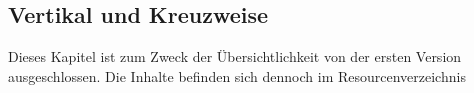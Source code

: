 \subsection{ Vertikal und Kreuzweise }
\label{cha:math-learn-page2}
Dieses Kapitel ist zum Zweck der Übersichtlichkeit von der ersten Version ausgeschlossen. Die Inhalte befinden sich dennoch im Resourcenverzeichnis
%
%
